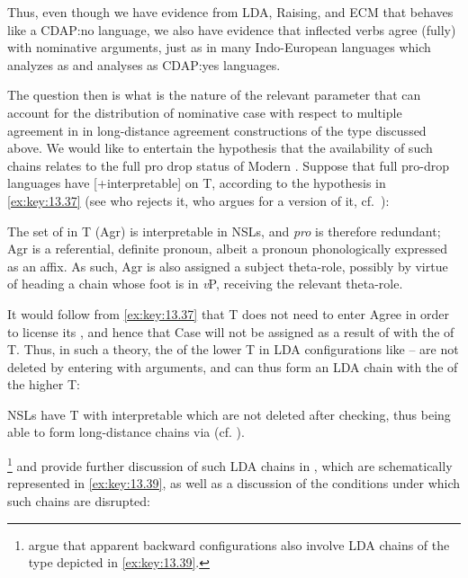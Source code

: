 \documentclass[output=paper]{langsci/langscibook}
\begin{document}
\begin{exe}
Thus, even though we have evidence from \gls{LDA}, Raising, and
\gls{ECM} that  behaves like a \gls{CDAP}:no
language, we also have evidence that inflected verbs agree (fully) with
nominative arguments, just as in many Indo-European
languages which \citet{Baker2015} analyzes as  and \citet{Baker2008}
analyses as \gls{CDAP}:yes languages.

The question then is what is the nature of the relevant parameter that can
account for the distribution of nominative case with respect to multiple
agreement in  in long-distance agreement constructions of the type
discussed above. We would like to entertain the hypothesis that the
availability of such chains relates to the full pro drop status of Modern
. Suppose that full pro-drop languages have [+interpretable]
 on T, according to the hypothesis in \eqref{ex:key:13.37} (see
\citealt{Holmberg2005} who rejects it, \citealt{Barbosa2009} who argues for a
version of it, cf.\ \citealt{AleAna1998}):

\ea%
    \label{ex:key:13.37}
    The set of  in T (Agr) is interpretable in \glspl{NSL}, and
    \emph{pro} is therefore redundant; Agr is a referential, definite pronoun,
    albeit a pronoun phonologically expressed as an affix. As such, Agr is also
    assigned a subject theta-role, possibly by virtue of heading a chain whose
    foot is in \emph{v}P,   receiving the relevant theta-role.
\z

It would follow from \eqref{ex:key:13.37} that T does not need to enter Agree
in order to license its , and hence that \Nom{} Case will not be
assigned as a result of  with the  of T. Thus, in such a
theory, the  of the lower T in \gls{LDA} configurations like
-- are not deleted by entering  with
\Nom{} arguments, and can thus form an \gls{LDA} chain with the  of
the higher T:

\ea%
    \label{ex:key:13.38}
    \glspl{NSL} have T with interpretable  which are not deleted after
    checking, thus being able to form long-distance chains via  (cf.
    \citealt{Ura1994}).
\z

\textcite{TsaAnaAle2017,TsaAleAna2019}\footnote{\citeauthor{TsaAnaAle2017}
argue that apparent backward  configurations also involve \gls{LDA}
chains of the type depicted in \eqref{ex:key:13.39}.} and \citet{AleAna2019} provide
further discussion of such \gls{LDA} chains in , which are schematically
represented in \eqref{ex:key:13.39}, as well as a discussion of the conditions under
which such chains are disrupted:


\end{exe}
\end{document}

